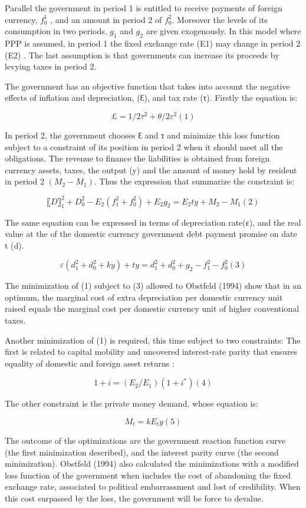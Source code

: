 \documentclass[a4paper,12pt]{article}
\begin{document}
Parallel the government in period 1 is entitled to receive payments of foreign currency, $f_0^1$  ,  and an amount in period 2 of $f_0^2$. Moreover the levels of its consumption in two periods, $g_1$ and $g_2$ are given exogenously. In this model where PPP is assumed, in period 1 the fixed exchange rate (E1) may change in period 2 (E2) . The last assumption is that governments can increase its proceeds by levying taxes in period 2. 

The government has an objective function that takes into account the negative effects of inflation and depreciation, (Ɛ), and tax rate (τ). Firstly the equation is:

$$£=  1/2 τ^2+  θ/2 ε^2            (1) $$

In period 2, the government chooses Ɛ and τ and minimize this loss function subject to a constraint of its position in period 2 when it should meet all the obligations. The revenue to finance the liabilities is obtained from foreign currency assets, taxes, the output (y) and the amount of money hold by resident in period 2 $(M_2-M_1)$. Thus the expression that summarize the constraint is:

$$〖              D〗_1^2+ D_0^2- E_2 (f_1^2+ f_0^2 )+E_2 g_2  = E_2 t y+M_2-M_1               (2) $$

The same equation can be expressed in terms of depreciation rate(ε), and the real value at the of the domestic currency government debt payment promise on date t (d).

$$ε(d_1^2+d_0^2+ky)+ty= d_1^2+d_0^2+g_2-f_1^2-f_0^2     (3)$$

The minimization of (1) subject to (3) allowed to Obstfeld (1994) show that in an optimum, the marginal cost of extra depreciation per domestic currency unit raised equals the marginal cost per domestic currency unit of higher conventional taxes. 

Another minimization of (1) is required, this time subject to two constraints: The first is related to capital mobility and uncovered interest-rate parity that ensures equality of domestic and foreign asset returns :

$$1+i=(E_2/E_1 )  (1+i^*)       (4)$$

The other constraint is the private money demand, whose equation is:

$$M_t=k E_t y      (5)$$

The outcome of the optimizations are the government reaction function curve (the first minimization described), and the interest parity curve (the second minimization). Obstfeld (1994) also calculated the minimizations with a modified loss function of the government when includes the cost of abandoning the fixed exchange rate, associated to political embarrassment and lost of credibility. When this cost surpassed by the loss, the government will be force to devalue.
\end{document}
